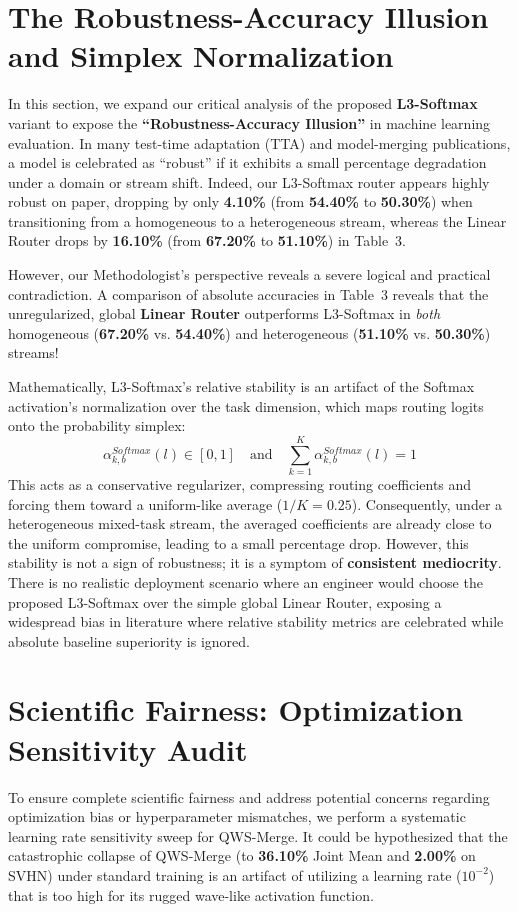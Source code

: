 \section{The Robustness-Accuracy Illusion and Simplex Normalization}
\label{sec:robustness_illusion_app}

In this section, we expand our critical analysis of the proposed \textbf{L3-Softmax} variant to expose the \textbf{``Robustness-Accuracy Illusion''} in machine learning evaluation. In many test-time adaptation (TTA) and model-merging publications, a model is celebrated as ``robust'' if it exhibits a small percentage degradation under a domain or stream shift. Indeed, our L3-Softmax router appears highly robust on paper, dropping by only \textbf{4.10\%} (from \textbf{54.40\%} to \textbf{50.30\%}) when transitioning from a homogeneous to a heterogeneous stream, whereas the Linear Router drops by \textbf{16.10\%} (from \textbf{67.20\%} to \textbf{51.10\%}) in Table~3.

However, our Methodologist's perspective reveals a severe logical and practical contradiction. A comparison of absolute accuracies in Table~3 reveals that the unregularized, global \textbf{Linear Router} outperforms L3-Softmax in \textit{both} homogeneous (\textbf{67.20\%} vs. \textbf{54.40\%}) and heterogeneous (\textbf{51.10\%} vs. \textbf{50.30\%}) streams! 

Mathematically, L3-Softmax's relative stability is an artifact of the Softmax activation's normalization over the task dimension, which maps routing logits onto the probability simplex:
\begin{equation}
    \alpha_{k, b}^{Softmax}(l) \in [0, 1] \quad \text{and} \quad \sum_{k=1}^K \alpha_{k, b}^{Softmax}(l) = 1
\end{equation}
This acts as a conservative regularizer, compressing routing coefficients and forcing them toward a uniform-like average ($1/K = 0.25$). Consequently, under a heterogeneous mixed-task stream, the averaged coefficients are already close to the uniform compromise, leading to a small percentage drop. However, this stability is not a sign of robustness; it is a symptom of \textbf{consistent mediocrity}. There is no realistic deployment scenario where an engineer would choose the proposed L3-Softmax over the simple global Linear Router, exposing a widespread bias in literature where relative stability metrics are celebrated while absolute baseline superiority is ignored.

\section{Scientific Fairness: Optimization Sensitivity Audit}
\label{sec:opt_audit_app}
To ensure complete scientific fairness and address potential concerns regarding optimization bias or hyperparameter mismatches, we perform a systematic learning rate sensitivity sweep for QWS-Merge. It could be hypothesized that the catastrophic collapse of QWS-Merge (to \textbf{36.10\%} Joint Mean and \textbf{2.00\%} on SVHN) under standard training is an artifact of utilizing a learning rate ($10^{-2}$) that is too high for its rugged wave-like activation function.

